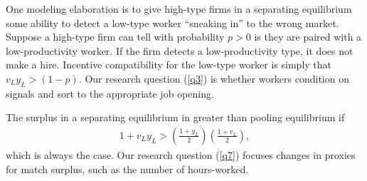 One modeling elaboration is to give high-type firms in a separating equilibrium some ability to detect a low-type worker ``sneaking in'' to the wrong market. 
Suppose a high-type firm can tell with probability $p > 0$ is they are paired with a low-productivity worker.
If the firm detects a low-productivity type, it does not make a hire.
Incentive compatibility for the low-type worker is simply that $v_L y_L > (1-p)$. 
Our research question (\ref{q3}) is whether workers condition on signals and sort to the appropriate job opening.

The surplus in a separating equilibrium in greater than pooling equilibrium if 
\begin{align}
  1 + v_L y_L > \left(\frac{1 + y_L}{2} \right) \left(\frac{1 + v_L}{2} \right),
\end{align}
which is always the case. 
Our research question (\ref{q7}) focuses changes in proxies for match surplus, such as the number of hours-worked. 

